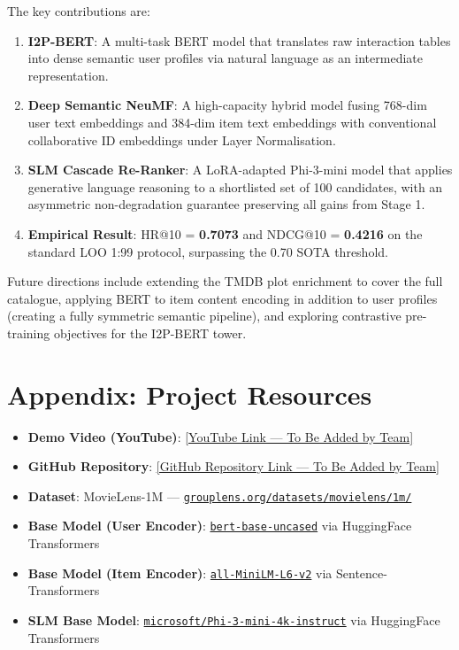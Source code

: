 \documentclass[11pt,a4paper]{article}
\newcommand{\projectlink}[2]{\href{#1}{\textcolor{iiitdblue}{\underline{#2}}}}
\begin{document}
The key contributions are:
\begin{enumerate}[leftmargin=1.5em]
  \item \textbf{I2P-BERT}: A multi-task BERT model that translates raw interaction tables into dense semantic user profiles via natural language as an intermediate representation.
  \item \textbf{Deep Semantic NeuMF}: A high-capacity hybrid model fusing 768-dim user text embeddings and 384-dim item text embeddings with conventional collaborative ID embeddings under Layer Normalisation.
  \item \textbf{SLM Cascade Re-Ranker}: A LoRA-adapted Phi-3-mini model that applies generative language reasoning to a shortlisted set of 100 candidates, with an asymmetric non-degradation guarantee preserving all gains from Stage 1.
  \item \textbf{Empirical Result}: HR@10 = \textbf{0.7073} and NDCG@10 = \textbf{0.4216} on the standard LOO 1:99 protocol, surpassing the 0.70 SOTA threshold.
\end{enumerate}

Future directions include extending the TMDB plot enrichment to cover the full catalogue, applying BERT to item content encoding in addition to user profiles (creating a fully symmetric semantic pipeline), and exploring contrastive pre-training objectives for the I2P-BERT tower.

\section*{Appendix: Project Resources}

\begin{itemize}[leftmargin=1.5em]
  \item \textbf{Demo Video (YouTube)}: \projectlink{https://}{[YouTube Link — To Be Added by Team]}
  \item \textbf{GitHub Repository}: \projectlink{https://}{[GitHub Repository Link — To Be Added by Team]}
  \item \textbf{Dataset}: MovieLens-1M — \href{https://grouplens.org/datasets/movielens/1m/}{\texttt{grouplens.org/datasets/movielens/1m/}}
  \item \textbf{Base Model (User Encoder)}: \href{https://huggingface.co/bert-base-uncased}{\texttt{bert-base-uncased}} via HuggingFace Transformers
  \item \textbf{Base Model (Item Encoder)}: \href{https://huggingface.co/sentence-transformers/all-MiniLM-L6-v2}{\texttt{all-MiniLM-L6-v2}} via Sentence-Transformers
  \item \textbf{SLM Base Model}: \href{https://huggingface.co/microsoft/Phi-3-mini-4k-instruct}{\texttt{microsoft/Phi-3-mini-4k-instruct}} via HuggingFace Transformers
\end{itemize}
\end{document}
